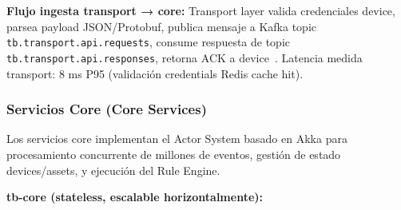 \textbf{Flujo ingesta transport → core:} Transport layer valida credenciales device, parsea payload JSON/Protobuf, publica mensaje a Kafka topic \texttt{tb.transport.api.requests}, consume respuesta de topic \texttt{tb.transport.api.responses}, retorna ACK a device~\cite{wulurCoordinationEdgeCloud2024}. Latencia medida transport: 8 ms P95 (validación credentials Redis cache hit).

\subsubsection{Servicios Core (Core Services)}

Los servicios core implementan el Actor System basado en Akka para procesamiento concurrente de millones de eventos, gestión de estado devices/assets, y ejecución del Rule Engine.

\textbf{tb-core (stateless, escalable horizontalmente):}

